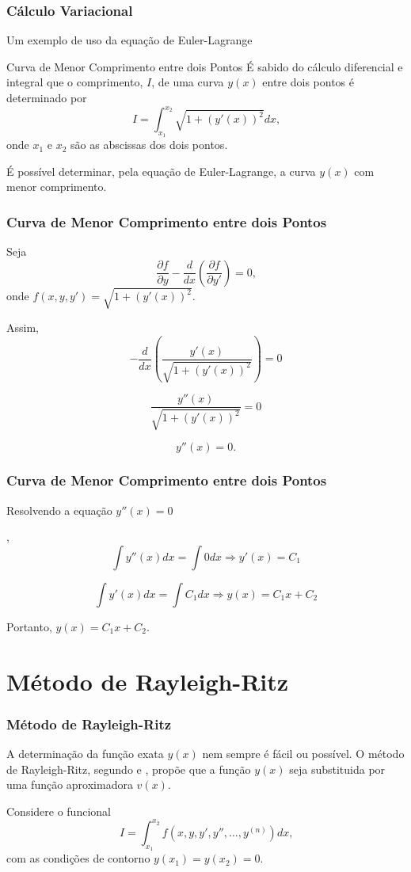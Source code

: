 \documentclass{beamer}
\newif\ifcompilepause
\newcommand{\cpause}{
	\ifcompilepause
	\pause
	\fi
}
\begin{document}
	\begin{frame}
		\frametitle{Cálculo Variacional}
		\justify
		
		Um exemplo de uso da equação de Euler-Lagrange
		\cpause
		\begin{block}{Curva de Menor Comprimento entre dois Pontos}
			É sabido do cálculo diferencial e integral que o comprimento, $I$, de uma curva $y(x)$ entre dois pontos é determinado por
			$$
				I=\int_{x_1}^{x_2} \sqrt{1+(y'(x))^2} dx
				\text{,}
			$$
			onde $x_1$ e $x_2$ são as abscissas dos dois pontos.
			
			É possível determinar, pela equação de Euler-Lagrange, a curva $y(x)$ com menor comprimento.
		\end{block}
	\end{frame}
	
	\begin{frame}
		\frametitle{Curva de Menor Comprimento entre dois Pontos}
		\justify
		
		Seja
		$$
			\frac{\partial f}{\partial y}
			-
			\frac{d}{dx} \left (
				\frac{\partial f}{\partial y'}
			\right )
			= 0
			\text{,}
		$$
		onde $f(x, y, y')=\sqrt{1+(y'(x))^2}$. \cpause Assim,
		$$
			-\frac{d}{dx} \left (
				\frac{y'(x)}{\sqrt{1+(y'(x))^2}}
			\right )
			= 0
		$$
		\cpause
		$$
			\frac{y''(x)}{
				\sqrt{1+(y'(x))^2}
			}
			= 0
		$$
		\cpause
		$$
			y''(x)=0
			\text{.}
		$$
	\end{frame}
	
	\begin{frame}
		\frametitle{Curva de Menor Comprimento entre dois Pontos}
		\justify
		
		Resolvendo a equação $y''(x)=0$\cpause ,
		$$
			\int y''(x)dx = \int 0 dx \Longrightarrow y'(x) = C_1
		$$
		\cpause
		$$
			\int y'(x)dx = \int C_1 dx \Longrightarrow y(x) = C_1 x + C_2
		$$
		\cpause
		Portanto, $y(x)=C_1 x + C_2$.
	\end{frame}
	
	
	\section{Método de Rayleigh-Ritz}
	\makesubtitleframe{Método de Rayleigh-Ritz}
	
	\begin{frame}
		\frametitle{Método de Rayleigh-Ritz}
		\justify
		
		A determinação da função exata $y(x)$ nem sempre é fácil ou possível. O método de Rayleigh-Ritz, segundo \cite{mefassan} e \cite{MRR_Deflex}, propõe que a função $y(x)$ seja substituida por uma função aproximadora $v(x)$.
		\vspace{10pt}
		\cpause
		
		Considere o funcional
		$$
			I = \int_{x_1}^{x_2} f(x, y, y', y'', \dots, y^{(n)})dx\text{,}
		$$
		com as condições de contorno $y(x_1)=y(x_2)=0$.
	\end{frame}
	
\end{document}
